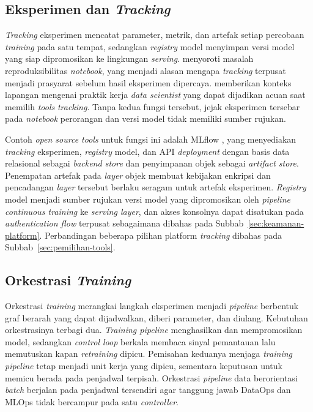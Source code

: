 \subsection{Eksperimen dan \textit{Tracking}}
\label{subsec:tracking}

\textit{Tracking} eksperimen mencatat parameter, metrik, dan artefak setiap percobaan \textit{training} pada satu tempat, sedangkan \textit{registry} model menyimpan versi model yang siap dipromosikan ke lingkungan \textit{serving}. \textcite{pimentel2019notebooks} menyoroti masalah reproduksibilitas \textit{notebook}, yang menjadi alasan mengapa \textit{tracking} terpusat menjadi prasyarat sebelum hasil eksperimen dipercaya. \textcite{anaconda2020state} memberikan konteks lapangan mengenai praktik kerja \textit{data scientist} yang dapat dijadikan acuan saat memilih \textit{tools} \textit{tracking}. Tanpa kedua fungsi tersebut, jejak eksperimen tersebar pada \textit{notebook} perorangan dan versi model tidak memiliki sumber rujukan.

Contoh \textit{open source tools} untuk fungsi ini adalah MLflow \autocite{mlflow2024}, yang menyediakan \textit{tracking} eksperimen, \textit{registry} model, dan API \textit{deployment} dengan basis data relasional sebagai \textit{backend store} dan penyimpanan objek sebagai \textit{artifact store}. Penempatan artefak pada \textit{layer} objek membuat kebijakan enkripsi dan pencadangan \textit{layer} tersebut berlaku seragam untuk artefak eksperimen. \textit{Registry} model menjadi sumber rujukan versi model yang dipromosikan oleh \textit{pipeline} \textit{continuous training} ke \textit{serving layer}, dan akses konsolnya dapat disatukan pada \textit{authentication flow} terpusat sebagaimana dibahas pada Subbab~\ref{sec:keamanan-platform}. Perbandingan beberapa pilihan platform \textit{tracking} dibahas pada Subbab~\ref{sec:pemilihan-tools}.

\subsection{Orkestrasi \textit{Training}}
\label{subsec:orkestrasi}

Orkestrasi \textit{training} merangkai langkah eksperimen menjadi \textit{pipeline} berbentuk graf berarah yang dapat dijadwalkan, diberi parameter, dan diulang. Kebutuhan orkestrasinya terbagi dua. \textit{Training pipeline} menghasilkan dan mempromosikan model, sedangkan \textit{control loop} berkala membaca sinyal pemantauan lalu memutuskan kapan \textit{retraining} dipicu. Pemisahan keduanya menjaga \textit{training pipeline} tetap menjadi unit kerja yang dipicu, sementara keputusan untuk memicu berada pada penjadwal terpisah. Orkestrasi \textit{pipeline} data berorientasi \textit{batch} berjalan pada penjadwal tersendiri agar tanggung jawab DataOps dan MLOps tidak bercampur pada satu \textit{controller}.

